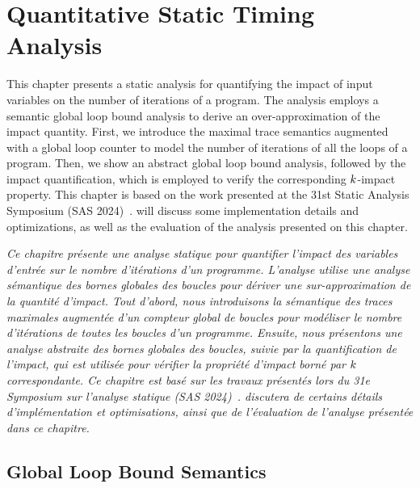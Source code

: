 
\setchapterpreamble[u]{\margintoc}

\chapter{Quantitative Static Timing Analysis}


\marginemptybox{6.8cm}

This chapter presents a static analysis for quantifying the impact of input variables on the number of iterations of a program.
The analysis employs a semantic global loop bound analysis to derive an over-approximation of the impact quantity.
First, we introduce the maximal trace semantics augmented with a global loop counter to model the number of iterations of all the loops of a program.
Then, we show an abstract global loop bound analysis, followed by the impact quantification, which is employed to verify the corresponding $k$-impact property.
This chapter is based on the work presented at the 31st Static Analysis Symposium (SAS 2024)~.
 will discuss some implementation details and optimizations, as well as the evaluation of the analysis presented on this chapter.


\frenchdiv

\emph{Ce chapitre présente une analyse statique pour quantifier l'impact des variables d'entrée sur le nombre d'itérations d'un programme. L'analyse utilise une analyse sémantique des bornes globales des boucles pour dériver une sur-approximation de la quantité d'impact. Tout d'abord, nous introduisons la sémantique des traces maximales augmentée d'un compteur global de boucles pour modéliser le nombre d'itérations de toutes les boucles d'un programme. Ensuite, nous présentons une analyse abstraite des bornes globales des boucles, suivie par la quantification de l'impact, qui est utilisée pour vérifier la propriété d'impact borné par $k$ correspondante. Ce chapitre est basé sur les travaux présentés lors du 31e Symposium sur l'analyse statique (SAS 2024)~\cite{Mazzucato2024c}.  discutera de certains détails d'implémentation et optimisations, ainsi que de l'évaluation de l'analyse présentée dans ce chapitre.}



\section{Global Loop Bound Semantics}


